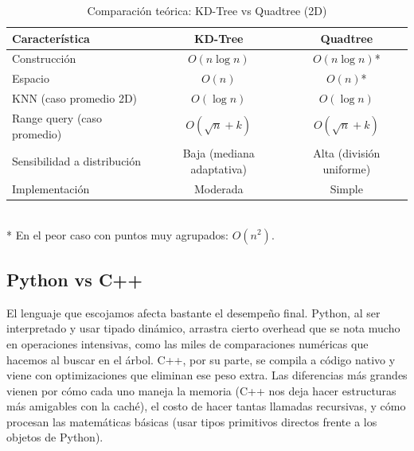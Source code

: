 \documentclass[11pt, a4paper]{article}
\begin{document}
\begin{table}[H]
\centering
\caption{Comparación teórica: KD-Tree vs Quadtree (2D)}
\label{tab:comparacion}
\begin{tabular}{@{}lcc@{}}
\toprule
\textbf{Característica}       & \textbf{KD-Tree}          & \textbf{Quadtree}         \\
\midrule
Construcción                  & $O(n \log n)$             & $O(n \log n)$*            \\
Espacio                       & $O(n)$                    & $O(n)$*                   \\
KNN (caso promedio 2D)        & $O(\log n)$               & $O(\log n)$               \\
Range query (caso promedio)   & $O(\sqrt{n} + k)$         & $O(\sqrt{n} + k)$         \\
Sensibilidad a distribución   & Baja (mediana adaptativa) & Alta (división uniforme)  \\
Implementación                & Moderada                  & Simple                    \\
\bottomrule
\end{tabular}
\\[0.5em]
\small{* En el peor caso con puntos muy agrupados: $O(n^2)$.}
\end{table}

\subsection{Python vs C++}

El lenguaje que escojamos afecta bastante el desempeño final. Python, al ser interpretado y usar tipado dinámico, arrastra cierto overhead que se nota mucho en operaciones intensivas, como las miles de comparaciones numéricas que hacemos al buscar en el árbol. C++, por su parte, se compila a código nativo y viene con optimizaciones que eliminan ese peso extra. Las diferencias más grandes vienen por cómo cada uno maneja la memoria (C++ nos deja hacer estructuras más amigables con la caché), el costo de hacer tantas llamadas recursivas, y cómo procesan las matemáticas básicas (usar tipos primitivos directos frente a los objetos de Python).
\end{document}
